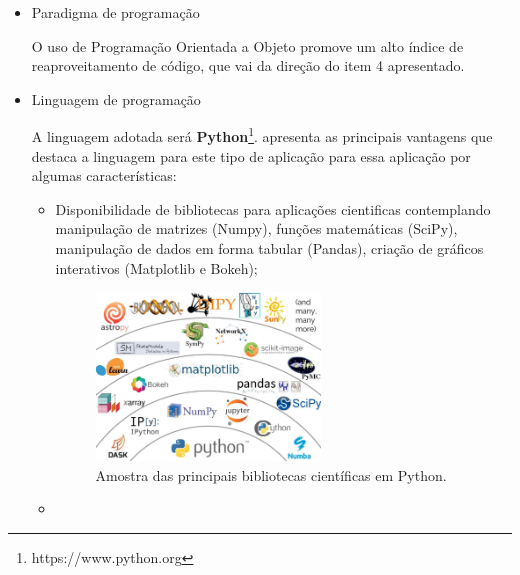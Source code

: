
\begin{itemize}

\item Paradigma de programação

O uso de Programação Orientada a Objeto promove um alto índice de reaproveitamento de código, que vai da direção do item 4 apresentado.

\item Linguagem de programação

A linguagem adotada será \textbf{Python}\footnote{https://www.python.org}.  apresenta as principais vantagens que destaca a linguagem para este tipo de aplicação para essa aplicação por algumas características:

\begin{itemize}
    \item Disponibilidade de bibliotecas para aplicações cientificas contemplando manipulação de matrizes (Numpy), funções matemáticas (SciPy), manipulação de dados em forma tabular (Pandas), criação de gráficos interativos (Matplotlib e Bokeh);
    
    \begin{figure}[!ht]
        \centering
        \includegraphics[width=0.6\textwidth]{imagens/python_ecosystem}
        \caption[Amostra das principais bibliotecas científicas em Python]{Amostra das principais bibliotecas científicas em Python.}\label{fig:python_ecosystem}
    \end{figure}

    \item 
\end{itemize}
\end{itemize}
